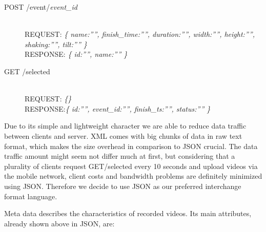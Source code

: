 \documentclass[conference]{IEEEtran}
\begin{document}
\begin{description}
	\item[POST /event/\textit{event\_id}]\hfill\\	
				REQUEST: \textit{\{ name:””, finish\_time:””, duration:””, width:””, height:””, shaking:””, tilt:”” \}}\hfill \\
				RESPONSE: \textit{\{ id:””, name:”” \}}

	\item[GET /selected]\hfill\\		
				REQUEST: \textit{\{\}}\hfill \\
				RESPONSE:\textit{\{ id:””, event\_id:””, finish\_ts:””, status:”” \}}

\end{description}

Due to its simple and lightweight character we are able to reduce data traffic between clients and server. 
XML comes with big chunks of data in raw text format, which makes the size overhead in comparison to JSON crucial.
The data traffic amount might seem not differ much at first, but considering that a plurality of clients request GET/selected every 10 seconds and upload videos via the mobile network, client costs and bandwidth problems are definitely minimized using JSON. Therefore we decide to use JSON as our preferred interchange format language.

Meta data describes the characteristics of recorded videos. Its main attributes, already shown above in JSON, are:
\end{document}
